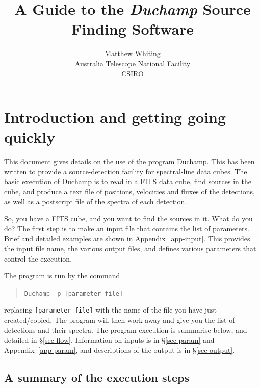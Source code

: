 \documentclass[12pt,a4paper]{article}
\title{A Guide to the {\it Duchamp} Source Finding Software}
\author{Matthew Whiting\\
Australia Telescope National Facility\\CSIRO}
\date{}
\begin{document}
\maketitle
\tableofcontents

\newpage
\section{Introduction and getting going quickly}

This document gives details on the use of the program Duchamp. This
has been written to provide a source-detection facility for
spectral-line data cubes. The basic execution of Duchamp is to read
in a FITS data cube, find sources in the cube, and produce a text
file of positions, velocities and fluxes of the detections, as well as
a postscript file of the spectra of each detection. 

So, you have a FITS cube, and you want to find the sources in it. What
do you do? The first step is to make an input file that contains the
list of parameters. Brief and detailed examples are shown in
Appendix~\ref{app-input}. This provides the input file name, the various
output files, and defines various parameters that control the
execution.

The program is run by the command
\begin{quote}
{\tt Duchamp -p [parameter file]}
\end{quote}
replacing {\tt [parameter file]} with the name of the file you have
just created/copied. The program will then work away and give you the
list of detections and their spectra. The program execution is
summarise below, and detailed in \S\ref{sec-flow}. Information on
inputs is in \S\ref{sec-param} and Appendix~\ref{app-param}, and
descriptions of the output is in \S\ref{sec-output}.

\subsection{A summary of the execution steps}
\end{document}
